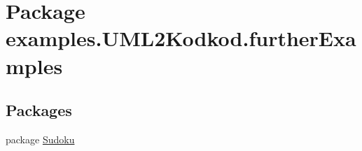 \hypertarget{namespaceexamples_1_1_u_m_l2_kodkod_1_1further_examples}{\section{Package examples.\-U\-M\-L2\-Kodkod.\-further\-Examples}
\label{namespaceexamples_1_1_u_m_l2_kodkod_1_1further_examples}
}
\subsection*{Packages}
\begin{DoxyCompactItemize}
\item 
package \hyperlink{namespaceexamples_1_1_u_m_l2_kodkod_1_1further_examples_1_1_sudoku}{Sudoku}
\end{DoxyCompactItemize}

